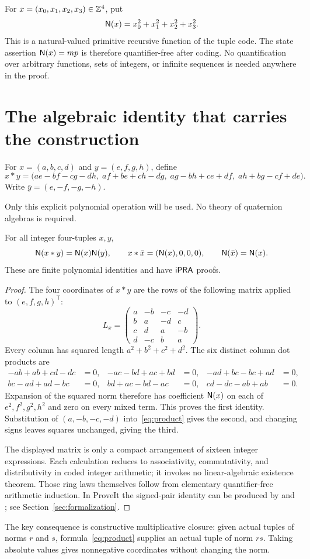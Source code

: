 For $x=(x_0,x_1,x_2,x_3)\in\mathbb Z^4$, put
\[
 \mathsf N(x)=x_0^2+x_1^2+x_2^2+x_3^2.
\]
This is a natural-valued primitive recursive function of the tuple code.
The state assertion $\mathsf N(x)=mp$ is therefore quantifier-free after coding.
No quantification over arbitrary functions, sets of integers, or infinite
sequences is needed anywhere in the proof.

\section{The algebraic identity that carries the construction}
\label{sec:identity}

\begin{definition}
For $x=(a,b,c,d)$ and $y=(e,f,g,h)$, define
\begin{equation}
\label{eq:product}
 x*y=\bigl(
 ae-bf-cg-dh,\;
 af+be+ch-dg,\;
 ag-bh+ce+df,\;
 ah+bg-cf+de
 \bigr).
\end{equation}
Write $\bar y=(e,-f,-g,-h)$.
\end{definition}

Only this explicit polynomial operation will be used. No theory of
quaternion algebras is required.

\begin{lemma}
\label{lem:euler}
For all integer four-tuples $x,y$,
\[
 \mathsf N(x*y)=\mathsf N(x)\mathsf N(y),\qquad
 x*\bar x=(\mathsf N(x),0,0,0),\qquad
 \mathsf N(\bar x)=\mathsf N(x).
\]
These are finite polynomial identities and have $\mathsf{iPRA}$ proofs.
\end{lemma}

\begin{proof}
The four coordinates of $x*y$ are the rows of the following matrix applied
to $(e,f,g,h)^{\mathsf T}$:
\[
 L_x=\begin{pmatrix}
 a&-b&-c&-d\\
 b&a&-d&c\\
 c&d&a&-b\\
 d&-c&b&a
 \end{pmatrix}.
\]
Every column has squared length $a^2+b^2+c^2+d^2$. The six distinct
column dot products are
\begin{align*}
 -ab+ab+cd-dc&=0,&
 -ac-bd+ac+bd&=0,&
 -ad+bc-bc+ad&=0,\\
 bc-ad+ad-bc&=0,&
 bd+ac-bd-ac&=0,&
 cd-dc-ab+ab&=0.
\end{align*}
Expansion of the squared norm therefore has coefficient $\mathsf N(x)$ on each
of $e^2,f^2,g^2,h^2$ and zero on every mixed term. This proves the first
identity. Substitution of $(a,-b,-c,-d)$ into~\eqref{eq:product} gives the
second, and changing signs leaves squares unchanged, giving the third.

The displayed matrix is only a compact arrangement of sixteen integer
expressions. Each calculation reduces to associativity, commutativity, and
distributivity in coded integer arithmetic; it invokes no linear-algebraic
existence theorem. Those ring laws themselves follow from elementary
quantifier-free arithmetic induction. In ProveIt the signed-pair identity
can be produced by  and ; see
Section~\ref{sec:formalization}.
\end{proof}

The key consequence is constructive multiplicative closure: given actual
tuples of norms $r$ and $s$, formula~\eqref{eq:product} supplies an actual
tuple of norm $rs$. Taking absolute values gives nonnegative coordinates
without changing the norm.
